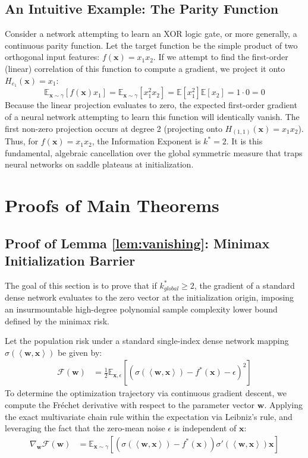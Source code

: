 \documentclass{article}
\newcommand{\E}{\mathbb{E}}
\newcommand{\1}{\mathbb{I}}
\newcommand{\inner}[2]{\left\langle#1, #2\right\rangle}
\newcommand{\calF}{\mathcal{F}}
\newcommand{\bx}{\mathbf{x}}
\newcommand{\bw}{\mathbf{w}}
\begin{document}
\subsection{An Intuitive Example: The Parity Function}
Consider a network attempting to learn an XOR logic gate, or more generally, a continuous parity function. Let the target function be the simple product of two orthogonal input features: $f(\bx) = x_1 x_2$. 
If we attempt to find the first-order (linear) correlation of this function to compute a gradient, we project it onto $H_{e_1}(\bx) = x_1$:
\begin{equation}
    \E_{\bx \sim \gamma}[f(\bx) x_1] = \E_{\bx \sim \gamma}[x_1^2 x_2] = \E[x_1^2] \E[x_2] = 1 \cdot 0 = 0
\end{equation}
Because the linear projection evaluates to zero, the expected first-order gradient of a neural network attempting to learn this function will identically vanish. The first non-zero projection occurs at degree 2 (projecting onto $H_{(1,1)}(\bx) = x_1 x_2$). Thus, for $f(\bx) = x_1 x_2$, the Information Exponent is $k^* = 2$. It is this fundamental, algebraic cancellation over the global symmetric measure that traps neural networks on saddle plateaus at initialization.

\section{Proofs of Main Theorems}
\label{app:proofs_main}

\subsection{Proof of Lemma \ref{lem:vanishing}: Minimax Initialization Barrier}
\label{app:lemma_vanishing}

The goal of this section is to prove that if $k_{global}^* \ge 2$, the gradient of a standard dense network evaluates to the zero vector at the initialization origin, imposing an insurmountable high-degree polynomial sample complexity lower bound defined by the minimax risk.

Let the population risk under a standard single-index dense network mapping $\sigma(\inner{\bw}{\bx})$ be given by:
\begin{align}
    \calF(\bw) &= \frac{1}{2} \E_{\bx, \epsilon} \left[ \left( \sigma(\inner{\bw}{\bx}) - f^*(\bx) - \epsilon \right)^2 \right]
\end{align}
To determine the optimization trajectory via continuous gradient descent, we compute the Fréchet derivative with respect to the parameter vector $\bw$. Applying the exact multivariate chain rule within the expectation via Leibniz's rule, and leveraging the fact that the zero-mean noise $\epsilon$ is independent of $\bx$:
\begin{align}
    \nabla_\bw \calF(\bw) &= \E_{\bx \sim \gamma} \left[ \left( \sigma(\inner{\bw}{\bx}) - f^*(\bx) \right) \sigma'(\inner{\bw}{\bx}) \bx \right]
\end{align}
\end{document}
